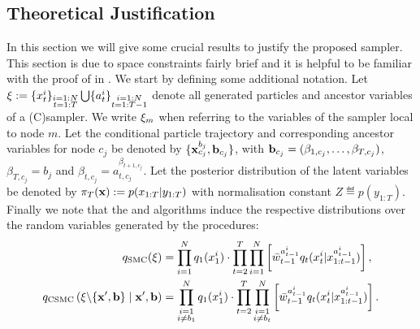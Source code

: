 \subsection{Theoretical Justification}
\label{sec:theory}
In this section we will give some crucial results to justify the proposed \ipmc sampler. This section is due to space constraints fairly brief and it is helpful to be familiar with the proof of \pg in \citet{andrieuDH2010}.
We start by defining some additional notation.
Let $\mathbf{\xi} := \{x_{t}^i\}_{\substack{i=1:N\\t=1:T}} \bigcup \{a_{t}^i\}_{\substack{i=1:N\\t=1:T-1}}$
denote all generated particles and ancestor variables of a (C)\smc sampler.
We write $\mathbf{\xi}_m$ when referring to the variables of the sampler local to node $m$.
%
Let the conditional particle trajectory and corresponding ancestor variables for node $c_j$ be denoted by $\{\mathbf{x}_{c_j}^{b_j},\mathbf{b}_{c_j}\}$, with $\mathbf{b}_{c_j} = (\beta_{1,c_j},\ldots,\beta_{T,c_j})$,
$\beta_{T,c_j} = b_j$ and $\beta_{t,c_j} = a_{t,c_j}^{\beta_{t+1,c_j}}$. %
Let the posterior distribution of the latent variables be denoted by $\pi_T(\mathbf{x}) := p(x_{1:T}|y_{1:T})$ with normalisation constant $Z \eqdef p(y_{1:T})$. 
%
Finally we %
note that the \smc and \csmc algorithms induce the respective distributions over the random variables
generated by the procedures:
\vspace{-2mm}
\begin{align*}
q_{\text{SMC}}(\mathbf{\xi}) &= \prod_{i=1}^N q_1(x_{1}^i) \cdot \prod_{t=2}^T \prod_{i=1}^N \left[ 
\bar w_{t-1}^{a_{t-1}^i}
q_t(x_{t}^i|x_{1:t-1}^{a_{t-1}^i}) \right], \\
q_{\text{CSMC}}\left(\mathbf{\xi} \backslash \{\mathbf{x}', \mathbf{b}\} \mid \mathbf{x}', \mathbf{b} \right) &= \prod_{\substack{i=1\\i\neq b_{1}}}^N  q_1(x_{1}^i) \cdot \prod_{t=2}^T \prod_{\substack{i=1\\i\neq b_{t}}}^N \left[
\bar w_{t-1}^{a_{t-1}^i}
q_t(x_{t}^i|x_{1:t-1}^{a_{t-1}^i})\right].
\end{align*}
